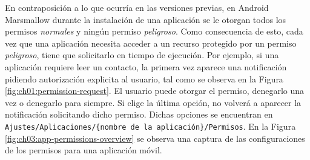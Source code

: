 En contraposición a lo que ocurría en las versiones previas, en Android Marsmallow durante la instalación de una aplicación se le otorgan todos los permisos \emph{normales} y ningún permiso \emph{peligroso}. Como consecuencia de esto, cada vez que una aplicación necesita acceder a un recurso protegido por un permiso \emph{peligroso}, tiene que solicitarlo en tiempo de ejecución. Por ejemplo, si una aplicación requiere leer un contacto, la primera vez aparece una notificación pidiendo autorización explicita al usuario, tal como se observa en la Figura \ref{fig:ch01:permission-request}. El usuario puede otorgar el permiso, denegarlo una vez o denegarlo para siempre. Si elige la última opción, no volverá a aparecer la notificación solicitando dicho permiso. Dichas opciones se encuentran en \texttt{Ajustes/Aplicaciones/\{nombre de la aplicación\}/Permisos}. En la Figura \ref{fig:ch03:app-permissions-overview} se observa una captura de las configuraciones de los permisos para una aplicación móvil.\\

